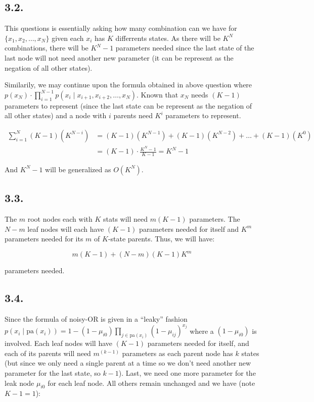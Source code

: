 \documentclass[11pt]{article}
\begin{document}
\subsection*{3.2.}

This questions is essentially asking how many combination can we have for $\{ x_1, x_2, \dots, x_N \}$ given each $x_i$ has $K$ differrents states. As there will be $K^N$ combinations, there will be $K^N - 1$ parameters needed since the last state of the last node will not need another new parameter (it can be represent as the negation of all other states).

Similarily, we may continue upon the formula obtained in above question where $p(x_N) \cdot \prod_{i = 1}^{N-1} p(x_i \mid x_{i+1},  x_{i+2}, \dots, x_{N})$. Known that $x_N$ needs $(K-1)$ parameters to represent (since the last state can be represent as the negation of all other states) and a node with $i$ parents need $K^i$ parameters to represent.

\begin{align*}
    \sum_{i = 1}^{N} (K-1)(K^{N - i}) &= (K - 1)(K^{N - 1}) + (K - 1)(K^{N - 2}) + \dots + (K - 1)(K^0) \\
    &= (K-1) \cdot \frac{K^N - 1}{K - 1} = K^N - 1
\end{align*}

And $K^N - 1$ will be generalized as $O(K^N)$.

\subsection*{3.3.}

The $m$ root nodes each with $K$ stats will need $m(K - 1)$ parameters. The $N-m$ leaf nodes will each have $(K-1)$ parameters needed for itself and $K^m$ parameters needed for its $m$ of $K$-state parents. Thus, we will have:

\begin{equation*}
    m(K - 1 ) + (N-m)(K-1)K^m
\end{equation*}

parameters needed.

\subsection*{3.4.}

Since the formula of noisy-OR is given in a ``leaky'' fashion $p(x_i \mid \textrm{pa}({x_i})) = 1 - (1 - \mu_{i0}) \prod_{j \in \textrm{pa}(x_i)}(1 - \mu_{ij})^{x_j}$ where a $(1 - \mu_{i0})$ is involved. Each leaf nodes will have $(K-1)$ parameters needed for itself, and each of its parents will need $m^(k-1)$ parameters as each parent node has $k$ states (but since we only need a single parent at a time so we don't need another new parameter for the last state, so $k-1$). Last, we need one more parameter for the leak node $\mu_{i0}$ for each leaf node. All others remain unchanged and we have (note $K - 1 = 1$):
\end{document}
